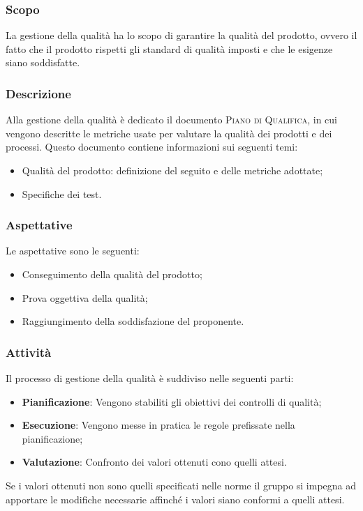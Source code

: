 \subsubsection{Scopo}
La gestione della qualità ha lo scopo di garantire la qualità del prodotto, ovvero il fatto che il prodotto rispetti gli 
standard di qualità imposti e che le esigenze siano soddisfatte.

\subsubsection{Descrizione}
Alla gestione della qualità è dedicato il documento \textsc{Piano di Qualifica}, in cui vengono descritte le metriche 
usate per valutare la qualità dei prodotti e dei processi. Questo documento contiene informazioni sui seguenti temi:
\begin{itemize}
    \item Qualità del prodotto: definizione del  seguito e delle metriche adottate;
    \item Specifiche dei test.
\end{itemize}

\subsubsection{Aspettative}
Le aspettative sono le seguenti:
\begin{itemize}
    \item Conseguimento della qualità del prodotto;
    \item Prova oggettiva della qualità;
    \item Raggiungimento della soddisfazione del proponente.
\end{itemize}

\subsubsection{Attività}
Il processo di gestione della qualità è suddiviso nelle seguenti parti:
\begin{itemize}
    \item \textbf{Pianificazione}: Vengono stabiliti gli obiettivi dei controlli di qualità;
    \item \textbf{Esecuzione}: Vengono messe in pratica le regole prefissate nella pianificazione;
    \item \textbf{Valutazione}: Confronto dei valori ottenuti cono quelli attesi.
\end{itemize}
Se i valori ottenuti non sono quelli specificati nelle norme il gruppo si impegna ad apportare le modifiche necessarie 
affinché i valori siano conformi a quelli attesi.

